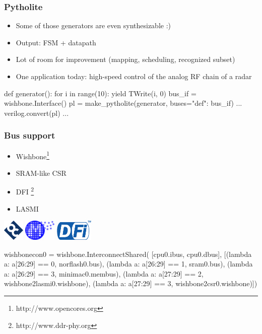 \documentclass[serif,mathserif]{beamer}
\begin{document}
\begin{frame}[fragile]
\frametitle{Pytholite}
\begin{itemize}
\item Some of those generators are even synthesizable :)
\item Output: FSM + datapath
\item Lot of room for improvement (mapping, scheduling, recognized subset)
\item One application today: high-speed control of the analog RF chain of a radar
\end{itemize}
\begin{verbatimtab}
def generator():
        for i in range(10):
                yield TWrite(i, 0)
bus_if = wishbone.Interface()
pl = make_pytholite(generator,
        buses={"def": bus_if})
... verilog.convert(pl) ...
\end{verbatimtab}
\end{frame}

\begin{frame}[fragile]
\frametitle{Bus support}
\begin{itemize}
\item Wishbone\footnote{http://www.opencores.org}
\item SRAM-like CSR
\item DFI \footnote{http://www.ddr-phy.org}
\item LASMI
\end{itemize}
\centering \includegraphics[height=1cm]{opencores.png} \includegraphics[height=1cm]{milkymist.png} \includegraphics[height=1cm]{dfi.png}
\begin{verbatimtab}
wishbonecon0 = wishbone.InterconnectShared(
        [cpu0.ibus, cpu0.dbus],
        [(lambda a: a[26:29] == 0, norflash0.bus),
         (lambda a: a[26:29] == 1, sram0.bus),
         (lambda a: a[26:29] == 3, minimac0.membus),
         (lambda a: a[27:29] == 2, wishbone2lasmi0.wishbone),
         (lambda a: a[27:29] == 3, wishbone2csr0.wishbone)])
\end{verbatimtab}
\end{frame}
\end{document}
